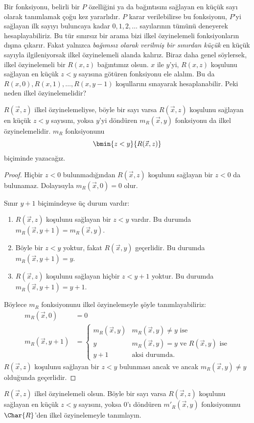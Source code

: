 


\begin{explain}
Bir fonksiyonu, belirli bir $P$ özelliğini ya da bağıntısını sağlayan en küçük
sayı olarak tanımlamak çoğu kez yararlıdır. $P$ karar verilebilirse bu
fonksiyonu, $P$'yi sağlayan ilk sayıyı buluncaya kadar $0,1,2,\dots$
sayılarının tümünü deneyerek hesaplayabiliriz. Bu tür sınırsız bir arama bizi
ilkel özyinelemeli fonksiyonların dışına çıkarır. Fakat yalnızca
\emph{bağımsız olarak verilmiş bir sınırdan küçük} en küçük sayıyla
ilgileniyorsak ilkel özyinelemeli alanda kalırız. Biraz daha genel söylersek,
ilkel özyinelemeli bir $R(x,z)$ bağıntımız olsun. $x$ ile $y$'yi,
$R(x,z)$ koşulunu sağlayan en küçük $z<y$ sayısına götüren fonksiyonu ele
alalım. Bu da $R(x,0),R(x,1),\dots,R(x,y-1)$ koşullarını sınayarak
hesaplanabilir. Peki neden ilkel özyinelemelidir?
\end{explain}

\begin{prop}
$R(\vec x,z)$ ilkel özyinelemeliyse, böyle bir sayı varsa $R(\vec x,z)$
koşulunu sağlayan en küçük $z<y$ sayısını, yoksa $y$'yi döndüren
$m_R(\vec x,y)$ fonksiyonu da ilkel özyinelemelidir. $m_R$ fonksiyonunu
\[
  \bmin{z<y}{R(\vec x,z)}
\]
biçiminde yazacağız.
\end{prop}

\begin{proof}
Hiçbir $z<0$ bulunmadığından $R(\vec x,z)$ koşulunu sağlayan bir $z<0$ da
bulunamaz. Dolayısıyla $m_R(\vec x,0)=0$ olur.

Sınır $y+1$ biçimindeyse üç durum vardır:
\begin{enumerate}
\item $R(\vec x,z)$ koşulunu sağlayan bir $z<y$ vardır. Bu durumda
  $m_R(\vec x,y+1)=m_R(\vec x,y)$.
\item Böyle bir $z<y$ yoktur, fakat $R(\vec x,y)$ geçerlidir. Bu durumda
  $m_R(\vec x,y+1)=y$.
\item $R(\vec x,z)$ koşulunu sağlayan hiçbir $z<y+1$ yoktur. Bu durumda
  $m_R(\vec x,y+1)=y+1$.
\end{enumerate}
Böylece $m_R$ fonksiyonunu ilkel özyinelemeyle şöyle tanımlayabiliriz:
\begin{align*}
  m_R(\vec x,0) & = 0\\
  m_R(\vec x,y+1) & = \begin{cases}
    m_R(\vec x,y) & \text{$m_R(\vec x,y)\neq y$ ise}\\
    y & \text{$m_R(\vec x,y)=y$ ve $R(\vec x,y)$ ise}\\
    y+1 & \text{aksi durumda.}
  \end{cases}
\end{align*}
$R(\vec x,z)$ koşulunu sağlayan bir $z<y$ bulunması ancak ve ancak
$m_R(\vec x,y)\neq y$ olduğunda geçerlidir.
\end{proof}

\begin{prob}
$R(\vec x,z)$ ilkel özyinelemeli olsun. Böyle bir sayı varsa
$R(\vec x,z)$ koşulunu sağlayan en küçük $z<y$ sayısını, yoksa $0$'ı
döndüren $m'_R(\vec x,y)$ fonksiyonunu $\Char{R}$'den ilkel özyinelemeyle
tanımlayın.
\end{prob}

